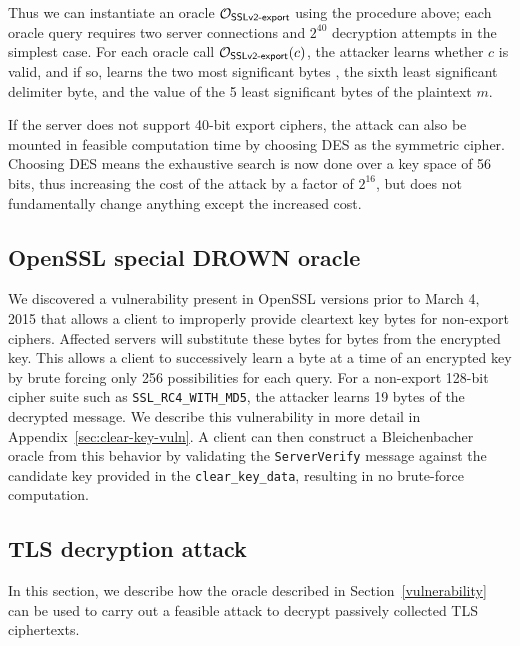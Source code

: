 Thus we can instantiate an oracle $\mathcal{O}_\textsf{SSLv2-export}$ using the procedure above; each oracle query requires two server connections and $2^{40}$ decryption attempts in the simplest case.  For each oracle call $\mathcal{O}_\textsf{SSLv2-export}(c)$, the attacker learns whether $c$ is valid, and if so, learns the two most significant bytes , the sixth least significant  delimiter byte, and the value of the 5 least significant bytes of the plaintext $m$.

\ifext
If the server does not support 40-bit export ciphers, the attack can also be mounted in feasible computation time by choosing DES as the symmetric cipher.  Choosing DES means the exhaustive search is now done over a key space of 56 bits, thus increasing the cost of the attack by a factor of \begin{math} 2^{16} \end{math}, but does not fundamentally change anything except the increased cost.
\fi

\ifsubmit\relax\else
\subsection{OpenSSL special DROWN oracle}

We discovered a vulnerability present in OpenSSL versions prior to March 4, 2015 that allows a client to improperly provide cleartext key bytes for non-export ciphers.  Affected servers will substitute these bytes for bytes from the encrypted key.  This allows a client to successively learn a byte at a time of an encrypted key by brute forcing only 256 possibilities for each query. For a non-export 128-bit cipher suite such as \texttt{SSL\_RC4\_WITH\_MD5}, the attacker learns 19 bytes of the decrypted message.  We describe this vulnerability in more detail in Appendix~\ref{sec:clear-key-vuln}.  A client can then construct a Bleichenbacher oracle from this behavior by validating the \texttt{ServerVerify} message against the candidate key provided in the \texttt{clear\_key\_data}, resulting in no brute-force computation.
\fi

\subsection{TLS decryption attack}
\label{sec:bb-performance}

In this section, we describe how the oracle described in Section~\ref{vulnerability} can be used to carry out a feasible attack to decrypt passively collected TLS ciphertexts.

